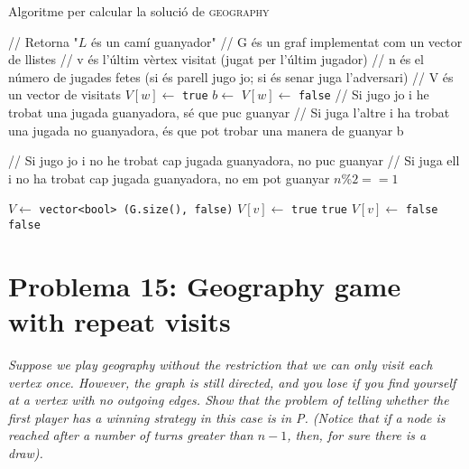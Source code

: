 \documentclass[a4paper]{article}
\begin{document}
\begin{algorithm}[H]
	\caption{Algoritme per calcular la solució de \textsc{geography}}
	\begin{algorithmic}[1]
		\State // Retorna "$L$ és un camí guanyador"
		\State // G és un graf implementat com un vector de llistes
		\State // v és l'últim vèrtex visitat (jugat per l'últim jugador)
		\State // n és el número de jugades fetes (si és parell jugo jo; si és senar juga l'adversari)
		\State // V és un vector de visitats
					\State $V[w] \gets$ \texttt{true}
					\State $b \gets$ 
					\State $V[w] \gets$ \texttt{false}
					\State
					\State // Si jugo jo i he trobat una jugada guanyadora, sé que puc guanyar
					\State // Si juga l'altre i ha trobat una jugada no guanyadora, és que pot trobar una manera de guanyar
						\State \Return b
					\EndIf
				\EndIf
			\EndFor
			
			\State // Si jugo jo i no he trobat cap jugada guanyadora, no puc guanyar
			\State // Si juga ell i no ha trobat cap jugada guanyadora, no em pot guanyar
			\State \Return $n\%2 == 1$
		\EndFunction
	\end{algorithmic}
\end{algorithm}

\begin{algorithm}[!h]
	\begin{algorithmic}[1]
			\State $V \gets$  \texttt{vector<bool> (G.size(), false)}
				\State $V[v] \gets$ \texttt{true}
					\State \Return \texttt{true}
				\EndIf
				\State $V[v] \gets$ \texttt{false}
			\EndFor
			\State \Return \texttt{false}
		\EndFunction
	\end{algorithmic}
\end{algorithm}

\section{Problema 15: Geography game with repeat visits}
\emph{Suppose we play geography without the restriction that we can only visit each vertex once. However, the graph is still directed, and you lose if you find yourself at a vertex with no outgoing edges. Show that the problem of telling whether the first player has a winning strategy in this case is in P. (Notice that if a node is reached after a number of turns greater than $n − 1$, then, for sure there is a draw).}
\end{document}
